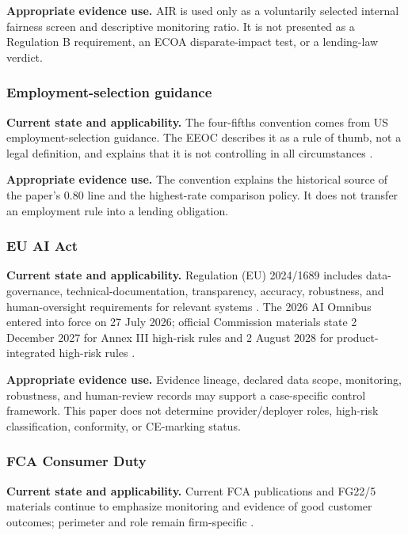 \textbf{Appropriate evidence use.} AIR
is used only as a voluntarily selected internal fairness screen and descriptive monitoring ratio.
It is not presented as a Regulation B requirement, an ECOA disparate-impact test, or a lending-law
verdict.

\subsubsection{Employment-selection guidance}

\textbf{Current state and applicability.} The four-fifths convention comes from US employment-selection
guidance. The EEOC describes it as a rule of thumb, not a legal definition, and explains that it is
not controlling in all circumstances \citep{eeoc_uniform_guidelines}.

\textbf{Appropriate evidence use.} The convention explains
the historical source of the paper's 0.80 line and the highest-rate comparison policy. It does not
transfer an employment rule into a lending obligation.

\subsubsection{EU AI Act}

\textbf{Current state and applicability.} Regulation (EU) 2024/1689 includes data-governance, technical-documentation,
transparency, accuracy, robustness, and human-oversight requirements for relevant systems
\citep{eu_ai_act}. The 2026 AI Omnibus entered into force on 27 July 2026; official Commission
materials state 2 December 2027 for Annex III high-risk rules and 2 August 2028 for
product-integrated high-risk rules \citep{eu_ai_omnibus_2026,eu_ai_act_faq_2026}.

\textbf{Appropriate evidence use.} Evidence lineage,
declared data scope, monitoring, robustness, and human-review records may support a case-specific
control framework. This paper does not determine provider/deployer roles, high-risk classification,
conformity, or CE-marking status.

\subsubsection{FCA Consumer Duty}

\textbf{Current state and applicability.} Current FCA publications and FG22/5 materials continue to emphasize monitoring
and evidence of good customer outcomes; perimeter and role remain firm-specific
\citep{fca_consumer_duty_2026}.


